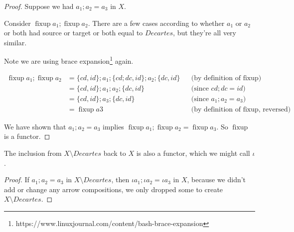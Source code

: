 \documentclass{proc-l}
\theoremstyle{definition}
\theoremstyle{remark}
\numberwithin{equation}{section}
\begin{document}
\begin{proof}
Suppose we had \(a_1; a_2 = a_3\) in \(X\).

Consider \(\operatorname{fixup} a_1; \operatorname{fixup} a_2\).
There are a few cases according to whether \(a_1\) or \(a_2\) or both had source or target or both equal to \(Decartes\),
but they're all very similar.

Note we are using brace expansion\footnote{https://www.linuxjournal.com/content/bash-brace-expansion} again.

\begin{align*}
\operatorname{fixup} a_1; \operatorname{fixup} a_2 & = \{ cd, id \}; a_1; \{ cd;dc, id \}; a_2; \{ dc, id \} && \text{(by definition of \(\operatorname{fixup}\))} \\
& = \{ cd, id \}; a_1; a_2; \{ dc, id \} && \text{(since \(cd; dc = id\))} \\
& = \{ cd, id \}; a_3; \{ dc, id \} && \text{(since \(a_1; a_2 = a_3\))} \\                         
& = \operatorname{fixup} a3 && \text{(by definition of \(\operatorname{fixup}\), reversed)}
\end{align*}

We have shown that \(a_1; a_2 = a_3\) implies \(\operatorname{fixup} a_1; \operatorname{fixup} a_2 = \operatorname{fixup} a_3\). So \(\operatorname{fixup}\) is a functor.
\end{proof}

The inclusion from \(X \setminus Decartes\) back to \(X\) is also a functor, which we might call \(\iota\).

\begin{proof}
If \(a_1; a_2 = a_3\) in \(X \setminus Decartes\), then \(\iota a_1; \iota a_2 = \iota a_3\) in \(X\),
because we didn't add or change any arrow compositions,
we only dropped some to create \(X \setminus Decartes\).
\end{proof}
\end{document}
